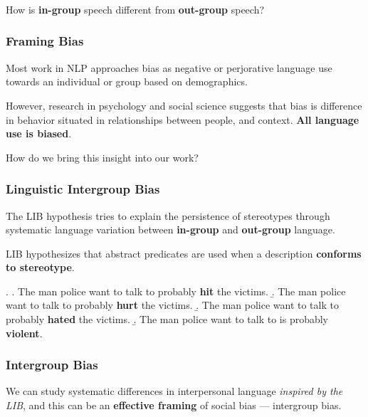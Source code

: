 \begin{frame}\frametitle{}
    How is \textbf{in-group} speech different from \textbf{out-group} speech?
\end{frame}

\begin{frame}[c]\frametitle{Framing Bias}

    Most work in NLP approaches bias as \alert{negative or perjorative language use towards an individual or group} based on demographics.\pause

    \vfill

    However, research in psychology and social science suggests that bias is difference in behavior situated in relationships between people, and context. \textbf{All language use is biased}.

    \vfill

    How do we bring this insight into our work?


\end{frame}


\begin{frame}[c]\frametitle{Linguistic Intergroup Bias}

    The LIB hypothesis tries to explain the persistence of stereotypes through systematic language variation between \textbf{in-group} and \textbf{out-group} language.
    
    \pause
    \vfill
    
    LIB hypothesizes that abstract predicates are used when a description \textbf{conforms to stereotype}.
    
    \ex. \a. The man police want to talk to probably \textbf{\alert{hit}} the victims.
         \b. The man police want to talk to probably \textbf{\alert{hurt}} the victims.
         \b. The man police want to talk to probably \textbf{\alert{hated}} the victims.
         \b. The man police want to talk to is probably \textbf{\alert{violent}}.

\end{frame}


\begin{frame}[c]\frametitle{Intergroup Bias}
        \centering\large
        We can study systematic differences in interpersonal language \emph{inspired by the LIB}, and this can be an \textbf{effective framing} of social bias --- intergroup bias.
\end{frame}

